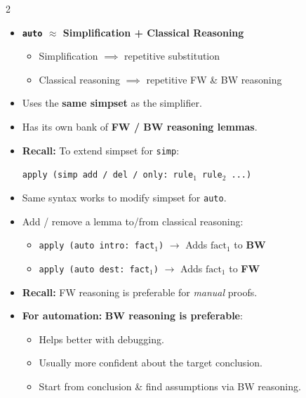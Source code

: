 \documentclass[9pt,a4paper]{extarticle}
\begin{document}
\begin{multicols*}{2}
\columnbreak

\begin{tcolorbox}[title=2. The \texttt{auto} Proof Method]
\begin{itemize}[leftmargin=1em, itemsep=1.5pt]
    \item \textbf{\texttt{auto} $\approx$ Simplification + Classical Reasoning}
    \begin{itemize}[leftmargin=0.8em, label=$\rightarrow$, itemsep=0pt]
        \item Simplification $\implies$ repetitive substitution
        \item Classical reasoning $\implies$ repetitive FW \& BW reasoning
    \end{itemize}
    \item Uses the \textbf{same simpset} as the simplifier.
    \item Has its own bank of \textbf{FW / BW reasoning lemmas}.
    \item \textbf{Recall:} To extend simpset for \texttt{simp}:
    \begin{center}
    \vspace{-0.2em}
    \texttt{\footnotesize apply (simp add / del / only: rule$_1$ rule$_2$ ...)}
    \vspace{-0.2em}
    \end{center}
    \item Same syntax works to modify simpset for \texttt{auto}.
    
    \item Add / remove a lemma to/from classical reasoning:
    \begin{itemize}[leftmargin=0.7em, label=--, itemsep=0pt]
        \item \texttt{\scriptsize apply (auto intro: fact$_1$)} $\rightarrow$ Adds $\text{fact}_1$ to \textbf{BW}
        \item \texttt{\scriptsize apply (auto dest: fact$_1$)} $\rightarrow$ Adds $\text{fact}_1$ to \textbf{FW}
    \end{itemize}
    
    \item \textbf{Recall:} FW reasoning is preferable for \textit{manual} proofs.
    \item \textbf{For automation:} \textbf{BW reasoning is preferable}:
    \begin{itemize}[leftmargin=0.7em, label=--, itemsep=0pt]
        \item Helps better with debugging.
        \item Usually more confident about the target conclusion.
        \item Start from conclusion \& find assumptions via BW reasoning.
    \end{itemize}
    

\end{itemize}
\end{tcolorbox}
\end{multicols*}
\end{document}
